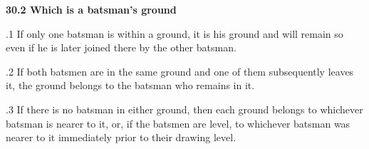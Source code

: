 \documentclass[12pt]{article}
\begin{document}
\vspace{\baselineskip}
{\fontsize{11pt}{13.2pt}\selectfont \textbf{30.2 \tabto{0.47in} Which is a batsman’s ground}\par}\par


\vspace{\baselineskip}
\begin{adjustwidth}{0.5in}{0.15in}
{\fontsize{9pt}{10.8pt}.1 \tabto{0.49in} If only one batsman is within a ground, it is his ground and will remain so even if he is later joined there by the other batsman.\par}\par

\end{adjustwidth}


\vspace{\baselineskip}
\begin{adjustwidth}{0.5in}{0.12in}
{\fontsize{9pt}{10.8pt}.2 \tabto{0.49in} If both batsmen are in the same ground and one of them subsequently leaves it, the ground belongs to the batsman who remains in it.\par}\par

\end{adjustwidth}


\vspace{\baselineskip}
\begin{adjustwidth}{0.5in}{0.06in}
{\fontsize{9pt}{10.8pt}.3 \tabto{0.49in} If there is no batsman in either ground, then each ground belongs to whichever batsman is nearer to it, or, if the batsmen are level, to whichever batsman was nearer to it immediately prior to their drawing level.\par}\par

\end{adjustwidth}


\vspace{\baselineskip}

\vspace{\baselineskip}

\vspace{\baselineskip}

\vspace{\baselineskip}

\vspace{\baselineskip}
\begin{Center}
{\fontsize{8pt}{9.6pt}\par}
\end{Center}\par
\end{document}
